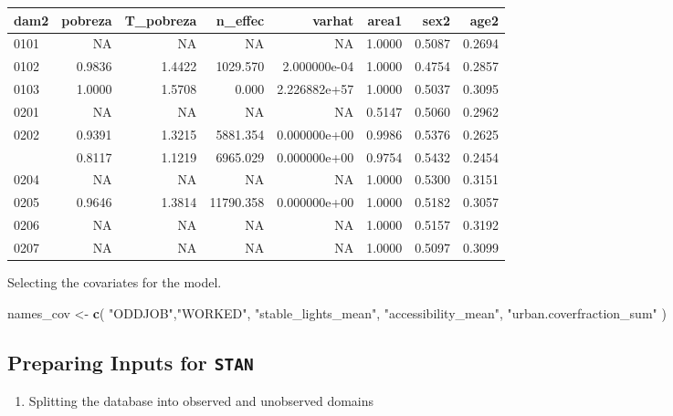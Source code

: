 \documentclass[
  12pt,
]{book}
\newenvironment{Shaded}{\begin{snugshade}}{\end{snugshade}}
\newcommand{\FunctionTok}[1]{\textcolor[rgb]{0.13,0.29,0.53}{\textbf{#1}}}
\newcommand{\NormalTok}[1]{#1}
\newcommand{\OtherTok}[1]{\textcolor[rgb]{0.56,0.35,0.01}{#1}}
\newcommand{\StringTok}[1]{\textcolor[rgb]{0.31,0.60,0.02}{#1}}
\providecommand{\tightlist}{%
  \setlength{\itemsep}{0pt}\setlength{\parskip}{0pt}}
\begin{document}
\begin{table}[H]
\centering
\centering
\begin{tabular}[t]{lrrrrrrr}
\toprule
dam2 & pobreza & T\_pobreza & n\_effec & varhat & area1 & sex2 & age2\\
\midrule
0101 & NA & NA & NA & NA & 1.0000 & 0.5087 & 0.2694\\
0102 & 0.9836 & 1.4422 & 1029.570 & 2.000000e-04 & 1.0000 & 0.4754 & 0.2857\\
0103 & 1.0000 & 1.5708 & 0.000 & 2.226882e+57 & 1.0000 & 0.5037 & 0.3095\\
0201 & NA & NA & NA & NA & 0.5147 & 0.5060 & 0.2962\\
0202 & 0.9391 & 1.3215 & 5881.354 & 0.000000e+00 & 0.9986 & 0.5376 & 0.2625\\
\addlinespace
0203 & 0.8117 & 1.1219 & 6965.029 & 0.000000e+00 & 0.9754 & 0.5432 & 0.2454\\
0204 & NA & NA & NA & NA & 1.0000 & 0.5300 & 0.3151\\
0205 & 0.9646 & 1.3814 & 11790.358 & 0.000000e+00 & 1.0000 & 0.5182 & 0.3057\\
0206 & NA & NA & NA & NA & 1.0000 & 0.5157 & 0.3192\\
0207 & NA & NA & NA & NA & 1.0000 & 0.5097 & 0.3099\\
\bottomrule
\end{tabular}
\end{table}

Selecting the covariates for the model.

\begin{Shaded}
\begin{Highlighting}[]
\NormalTok{names\_cov }\OtherTok{\textless{}{-}}
    \FunctionTok{c}\NormalTok{(}
       \StringTok{"ODDJOB"}\NormalTok{,}\StringTok{"WORKED"}\NormalTok{,}
      \StringTok{"stable\_lights\_mean"}\NormalTok{,}
      \StringTok{"accessibility\_mean"}\NormalTok{,}
      \StringTok{"urban.coverfraction\_sum"}
\NormalTok{    )}
\end{Highlighting}
\end{Shaded}

\hypertarget{preparing-inputs-for-stan}{%
\subsection{\texorpdfstring{Preparing Inputs for \texttt{STAN}}{Preparing Inputs for STAN}}\label{preparing-inputs-for-stan}}

\begin{enumerate}
\def\labelenumi{\arabic{enumi}.}
\tightlist
\item
  Splitting the database into observed and unobserved domains
\end{enumerate}
\end{document}
